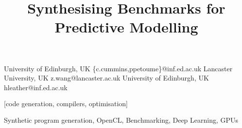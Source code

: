 \makeatletter
\def\@copyrightspace{\relax}
\makeatother

\setlength{\pdfpageheight}{\paperheight}
\setlength{\pdfpagewidth}{\paperwidth}


\title{Synthesising Benchmarks for Predictive Modelling}
           {University of Edinburgh, UK}
           {\{c.cummins,ppetoume\}@inf.ed.ac.uk}
           {Lancaster University, UK}
           {z.wang@lancaster.ac.uk}
           {University of Edinburgh, UK}
           {hleather@inf.ed.ac.uk}

\maketitle

\begin{abstract}

\end{abstract}

[code generation, compilers, optimisation]

\keywords
Synthetic program generation, %
OpenCL, %
Benchmarking, %
Deep Learning, %
GPUs
